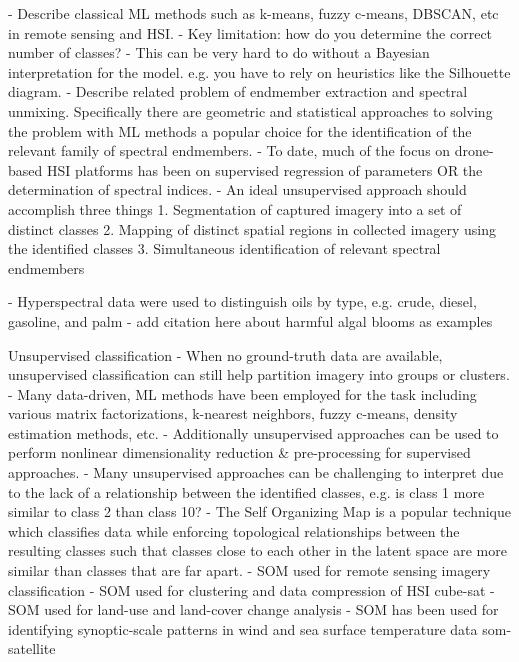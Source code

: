 \documentclass{article}
\begin{document}
- Describe classical ML methods such as k-means, fuzzy c-means, DBSCAN, etc in remote sensing and HSI. 
    - Key limitation: how do you determine the correct number of classes?
    - This can be very hard to do without a Bayesian interpretation for the model. e.g. you have to rely on heuristics like the Silhouette diagram.
- Describe related problem of endmember extraction and spectral unmixing. Specifically there are geometric and statistical approaches to solving the problem with ML methods a popular choice for the identification of the relevant family of spectral endmembers.
- To date, much of the focus on drone-based HSI platforms has been on supervised regression of parameters OR the determination of spectral indices.
- An ideal unsupervised approach should accomplish three things
    1. Segmentation of captured imagery into a set of distinct classes
    2. Mapping of distinct spatial regions in collected imagery using the identified classes
    3. Simultaneous identification of relevant spectral endmembers


- Hyperspectral data were used to distinguish oils by type, e.g. crude, diesel, gasoline, and palm \cite{yang2020characterization}
- add citation here about harmful algal blooms as examples

Unsupervised classification
- When no ground-truth data are available, unsupervised classification can still help partition imagery into groups or clusters.
- Many data-driven, ML methods have been employed for the task including various matrix factorizations, k-nearest neighbors, fuzzy c-means, density estimation methods, etc. \cite{zhang2019hyperspectral}
- Additionally unsupervised approaches can be used to perform nonlinear dimensionality reduction & pre-processing for supervised approaches.
- Many unsupervised approaches can be challenging to interpret due to the lack of a relationship between the identified classes, e.g. is class 1 more similar to class 2 than class 10?
- The Self Organizing Map is a popular technique which classifies data while enforcing topological relationships between the resulting classes such that classes close to each  other in the latent space are more similar than classes that are far apart.
- SOM used for remote sensing imagery classification \cite{msom-remote-sensing}
- SOM used for clustering and data compression of HSI cube-sat \cite{danielsen2021self}
- SOM used for land-use and land-cover change analysis \cite{penfound2021analysis}
- SOM has been used for identifying synoptic-scale patterns in wind and sea surface temperature data {som-satellite}
\end{document}
